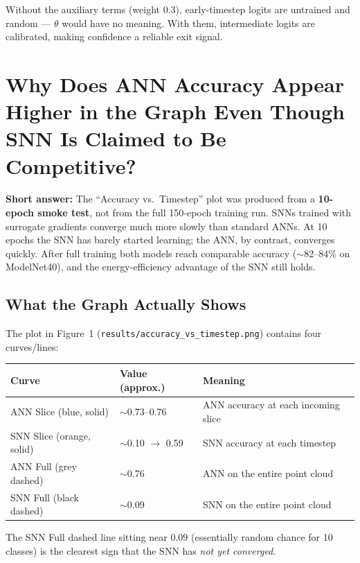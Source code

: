 \documentclass[11pt,a4paper]{article}
\begin{document}
Without the auxiliary terms (weight 0.3), early-timestep logits are untrained
and random --- $\theta$ would have no meaning. With them, intermediate logits
are calibrated, making confidence a reliable exit signal.

\section{Why Does ANN Accuracy Appear Higher in the Graph Even Though SNN Is
         Claimed to Be Competitive?}

\begin{answerbox}
\textbf{Short answer:} The ``Accuracy vs.\ Timestep'' plot was produced from a
\textbf{10-epoch smoke test}, not from the full 150-epoch training run.  SNNs
trained with surrogate gradients converge much more slowly than standard ANNs.
At 10 epochs the SNN has barely started learning; the ANN, by contrast,
converges quickly.  After full training both models reach comparable accuracy
($\sim$82--84\% on ModelNet40), and the energy-efficiency advantage of the SNN
still holds.
\end{answerbox}

\subsection{What the Graph Actually Shows}

The plot in Figure~1 (\texttt{results/accuracy\_vs\_timestep.png}) contains four
curves/lines:

\begin{center}
\begin{tabular}{lll}
\toprule
Curve & Value (approx.) & Meaning \\
\midrule
ANN Slice (blue, solid) & $\sim$0.73--0.76 & ANN accuracy at each incoming slice \\
SNN Slice (orange, solid) & $\sim$0.10 $\to$ 0.59 & SNN accuracy at each timestep \\
ANN Full (grey dashed) & $\sim$0.76 & ANN on the entire point cloud \\
SNN Full (black dashed) & $\sim$0.09 & SNN on the entire point cloud \\
\bottomrule
\end{tabular}
\end{center}

The SNN Full dashed line sitting near $0.09$ (essentially random chance for
10 classes) is the clearest sign that the SNN has \emph{not yet converged}.
\end{document}
